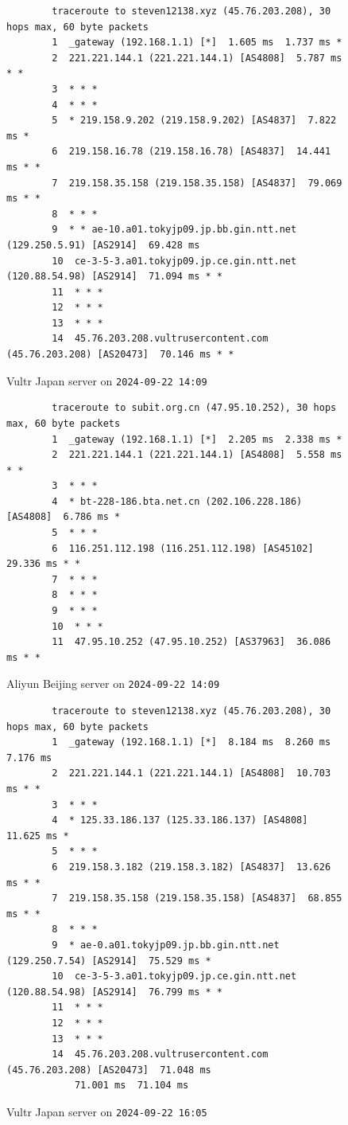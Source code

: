\documentclass{cshwk}
\begin{document}
\begin{figure}[H]
    \footnotesize
    \begin{verbatim}
        traceroute to steven12138.xyz (45.76.203.208), 30 hops max, 60 byte packets
        1  _gateway (192.168.1.1) [*]  1.605 ms  1.737 ms *
        2  221.221.144.1 (221.221.144.1) [AS4808]  5.787 ms * *
        3  * * *
        4  * * *
        5  * 219.158.9.202 (219.158.9.202) [AS4837]  7.822 ms *
        6  219.158.16.78 (219.158.16.78) [AS4837]  14.441 ms * *
        7  219.158.35.158 (219.158.35.158) [AS4837]  79.069 ms * *
        8  * * *
        9  * * ae-10.a01.tokyjp09.jp.bb.gin.ntt.net (129.250.5.91) [AS2914]  69.428 ms
        10  ce-3-5-3.a01.tokyjp09.jp.ce.gin.ntt.net (120.88.54.98) [AS2914]  71.094 ms * *
        11  * * *
        12  * * *
        13  * * *
        14  45.76.203.208.vultrusercontent.com (45.76.203.208) [AS20473]  70.146 ms * *
    \end{verbatim}
    \caption{Vultr Japan server on \texttt{2024-09-22 14:09}}
\end{figure}

\begin{figure}[H]
    \footnotesize
    \begin{verbatim}
        traceroute to subit.org.cn (47.95.10.252), 30 hops max, 60 byte packets
        1  _gateway (192.168.1.1) [*]  2.205 ms  2.338 ms *
        2  221.221.144.1 (221.221.144.1) [AS4808]  5.558 ms * *
        3  * * *
        4  * bt-228-186.bta.net.cn (202.106.228.186) [AS4808]  6.786 ms *
        5  * * *
        6  116.251.112.198 (116.251.112.198) [AS45102]  29.336 ms * *
        7  * * *
        8  * * *
        9  * * *
        10  * * *
        11  47.95.10.252 (47.95.10.252) [AS37963]  36.086 ms * *
    \end{verbatim}
    \caption{Aliyun Beijing server on \texttt{2024-09-22 14:09}}
\end{figure}

\begin{figure}[H]
    \footnotesize
    \begin{verbatim}
        traceroute to steven12138.xyz (45.76.203.208), 30 hops max, 60 byte packets
        1  _gateway (192.168.1.1) [*]  8.184 ms  8.260 ms  7.176 ms
        2  221.221.144.1 (221.221.144.1) [AS4808]  10.703 ms * *
        3  * * *
        4  * 125.33.186.137 (125.33.186.137) [AS4808]  11.625 ms *
        5  * * *
        6  219.158.3.182 (219.158.3.182) [AS4837]  13.626 ms * *
        7  219.158.35.158 (219.158.35.158) [AS4837]  68.855 ms * *
        8  * * *
        9  * ae-0.a01.tokyjp09.jp.bb.gin.ntt.net (129.250.7.54) [AS2914]  75.529 ms *
        10  ce-3-5-3.a01.tokyjp09.jp.ce.gin.ntt.net (120.88.54.98) [AS2914]  76.799 ms * *
        11  * * *
        12  * * *
        13  * * *
        14  45.76.203.208.vultrusercontent.com (45.76.203.208) [AS20473]  71.048 ms 
            71.001 ms  71.104 ms
    \end{verbatim}
    \caption{Vultr Japan server on \texttt{2024-09-22 16:05}}
\end{figure}
\end{document}
